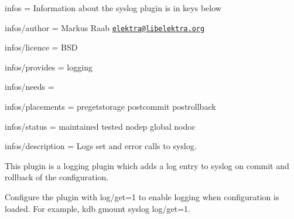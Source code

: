 
\begin{DoxyItemize}
\item infos = Information about the syslog plugin is in keys below
\item infos/author = Markus Raab \href{mailto:elektra@libelektra.org}{\tt elektra@libelektra.\+org}
\item infos/licence = B\+SD
\item infos/provides = logging
\item infos/needs =
\item infos/placements = pregetstorage postcommit postrollback
\item infos/status = maintained tested nodep global nodoc
\item infos/description = Logs set and error calls to syslog.
\end{DoxyItemize}

This plugin is a logging plugin which adds a log entry to syslog on commit and rollback of the configuration.

Configure the plugin with {\ttfamily log/get=1} to enable logging when configuration is loaded. For example, {\ttfamily kdb gmount syslog log/get=1}. 